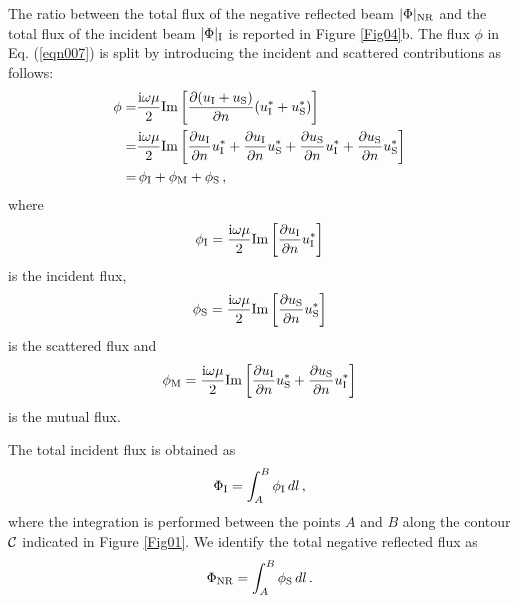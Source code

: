 \documentclass[10p]{article}
\begin{document}
The ratio between the total flux of the negative reflected beam $|\Phi|_\textup{NR}$ and the total flux of the incident beam $|\Phi|_\textup{I}$ is reported in Figure \ref{Fig04}b.
The flux $\phi$ in Eq. (\ref{eqn007}) is split by introducing the incident and scattered contributions as follows:
\begin{equation}
\label{eqn008}
\begin{split}
\phi=& \frac{\mathrm{i}\omega\mu}{2}\mathrm{Im}\left[\frac{\partial (u_\textup{I}+u_\textup{S})}{\partial n} (u^*_\textup{I}+u^*_\textup{S})\right]\\
= & \frac{\mathrm{i}\omega\mu}{2}\mathrm{Im}\left[\frac{\partial u_\textup{I}}{\partial n} u^*_\textup{I}+
\frac{\partial u_\textup{I}}{\partial n} u^*_\textup{S}+
\frac{\partial u_\textup{S}}{\partial n} u^*_\textup{I}+
\frac{\partial u_\textup{S}}{\partial n} u^*_\textup{S}\right]\\
=&\,\phi_\textup{I}+\phi_\textup{M}+\phi_\textup{S}\,,
\end{split}
\end{equation}
where
\begin{equation}
\label{eqn009}
\phi_\textup{I} = \frac{\mathrm{i}\omega\mu}{2}\mathrm{Im}\left[\frac{\partial u_\textup{I}}{\partial n} u^*_\textup{I}\right]
\end{equation}
is the incident flux,
\begin{equation}
\label{eqn010}
\phi_\textup{S} = \frac{\mathrm{i}\omega\mu}{2}\mathrm{Im}\left[\frac{\partial u_\textup{S}}{\partial n} u^*_\textup{S}\right]
\end{equation}
is the scattered flux and
\begin{equation}
\label{eqn011}
\phi_\textup{M} = \frac{\mathrm{i}\omega\mu}{2}\mathrm{Im}\left[\frac{\partial u_\textup{I}}{\partial n} u^*_\textup{S}+\frac{\partial u_\textup{S}}{\partial n} u^*_\textup{I}\right]
\end{equation}
is the mutual flux.

The total incident flux is obtained as
\begin{equation}
\label{eqn012}
\Phi_\textup{I} = \int_A^B \phi_\textup{I} \, dl \,,
\end{equation}
where the integration is performed between the points $A$ and $B$ along the contour $\cal C$ indicated in Figure \ref{Fig01}.
We identify the total negative reflected flux as 
\begin{equation}
\label{eqn013}
\Phi_\textup{NR} = \int_A^B \phi_\textup{S} \, dl\,.
\end{equation}
\end{document}
